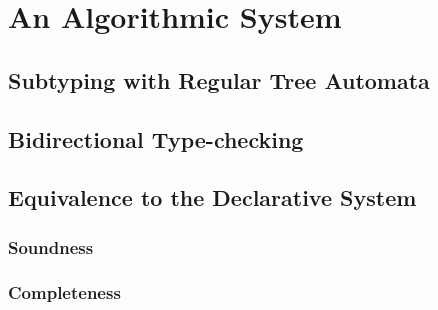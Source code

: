 
\chapter{An Algorithmic System}

\section{Subtyping with Regular Tree Automata}

\section{Bidirectional Type-checking}


\section{Equivalence to the Declarative System}

\subsection{Soundness}

\subsection{Completeness}
